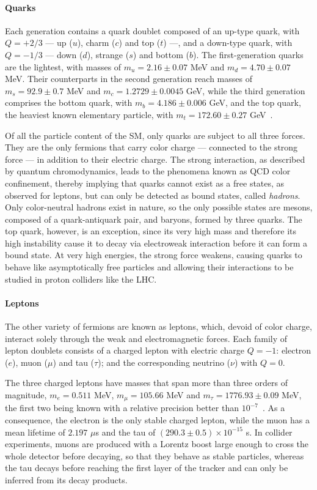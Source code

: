\paragraph{Quarks}
%
Each generation contains a quark doublet composed of an up-type quark, with $Q=+2/3$ — up ($u$), charm ($c$) and top ($t$) —, and a down-type quark, with $Q=-1/3$ — down ($d$), strange ($s$) and bottom ($b$). The first-generation quarks are the lightest, with masses of $m_u = 2.16 \pm 0.07$ MeV and $m_d = 4.70 \pm 0.07$ MeV. Their counterparts in the second generation reach masses of $m_s = 92.9 \pm 0.7$ MeV and $m_c = 1.2729 \pm 0.0045$ GeV, while the third generation comprises the bottom quark, with $m_b = 4.186 \pm 0.006$ GeV, and the top quark, the heaviest known elementary particle, with $m_t = 172.60 \pm 0.27$ GeV~\cite{ParticleDataGroup:2026mpi}. 

Of all the particle content of the SM, only quarks are subject to all three forces. They are the only fermions that carry color charge — connected to the strong force — in addition to their electric charge. The strong interaction, as described by quantum chromodynamics, leads to the phenomena known as QCD color confinement, thereby implying that quarks cannot exist as a free states, as observed for leptons, but can only be detected as bound states, called \textit{hadrons}. Only color-neutral hadrons exist in nature, so the only possible states are mesons, composed of a quark-antiquark pair, and baryons, formed by three quarks. The top quark, however, is an exception, since its very high mass and therefore its high instability cause it to decay via electroweak interaction before it can form a bound state. At very high energies, the strong force weakens, causing quarks to behave like asymptotically free particles and allowing their interactions to be studied in proton colliders like the LHC.

\paragraph{Leptons}
The other variety of fermions are known as leptons, which, devoid of color charge, interact solely through the weak and electromagnetic forces. Each family of lepton doublets consists of a charged lepton with electric charge $Q=-1$: electron ($e$), muon ($\mu$) and tau ($\tau$); and the corresponding neutrino ($\nu$) with $Q=0$.

The three charged leptons have masses that span more than three orders of magnitude, $m_e = 0.511$ MeV, $m_\mu = 105.66$ MeV and $m_\tau = 1776.93 \pm 0.09$ MeV, the first two being known with a relative precision better than $10^{-7}$~\cite{ParticleDataGroup:2026mpi}. As a consequence, the electron is the only stable charged lepton, while the muon has a mean lifetime of $2.197$ $\mu$s and the tau of $(290.3 \pm 0.5) \times 10^{-15}$ s. In collider experiments, muons are produced with a Lorentz boost large enough to cross the whole detector before decaying, so that they behave as stable particles, whereas the tau decays before reaching the first layer of the tracker and can only be inferred from its decay products.

